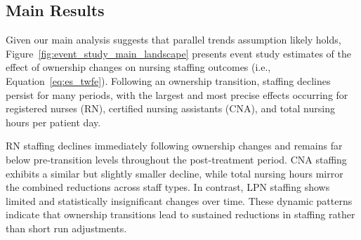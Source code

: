 \documentclass[preprint,authoryear]{elsarticle}
\begin{document}
\subsection{Main Results}

Given our main analysis suggests that parallel trends assumption likely holds, Figure~\ref{fig:event_study_main_landscape} presents event study estimates of the effect of ownership changes on nursing staffing outcomes (i.e., Equation~\ref{eq:es_twfe}). Following an ownership transition, staffing declines persist for many periods, with the largest and most precise effects occurring for registered nurses (RN), certified nursing assistants (CNA), and total nursing hours per patient day.

RN staffing declines immediately following ownership changes and remains far below pre-transition levels throughout the post-treatment period. CNA staffing exhibits a similar but slightly smaller decline, while total nursing hours mirror the combined reductions across staff types. In contrast, LPN staffing shows limited and statistically insignificant changes over time. These dynamic patterns indicate that ownership transitions lead to sustained reductions in staffing rather than short run adjustments.


\end{document}
